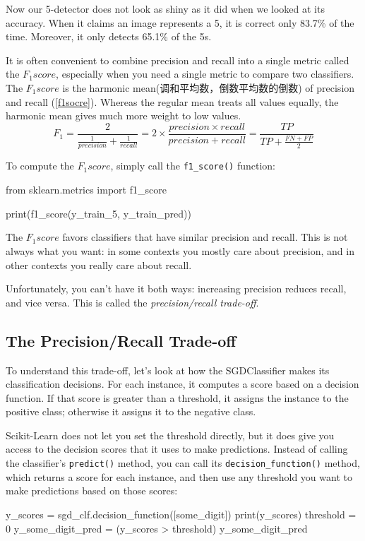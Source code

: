 Now our 5-detector does not look as shiny as it did when we looked at its accuracy. When it claims an image represents a 5, it is correct only 83.7\% of the time. Moreover, it only detects 65.1\% of the 5s.

It is often convenient to combine precision and recall into a single metric called the $F_1 score$, especially when you need a single metric to compare two classifiers. The $F_1 score$ is the harmonic mean(调和平均数，倒数平均数的倒数) of precision and recall (\autoref{f1socre}). Whereas the regular mean treats all values equally, the harmonic mean gives much more weight to low values.
\begin{equation}\label{f1socre}
    F_1 =\frac{2}{\frac{1}{precision} + \frac{1}{ recall}} = 2 \times \frac{precision \times recall}{precision + recall}=\frac{TP}{TP+\frac{FN+FP}{2}}
\end{equation}

To compute the $F_1 score$, simply call the \verb|f1_score()| function:
\begin{pyc}
from sklearn.metrics import f1_score

print(f1_score(y_train_5, y_train_pred))
\end{pyc}

The $F_1 score$ favors classifiers that have similar precision and recall. This is not always what you want: in some contexts you mostly care about precision, and in other contexts you really care about recall.

Unfortunately, you can't have it both ways: increasing precision reduces recall, and vice versa. This is called the \emph{precision/recall trade-off}.

\subsection{The Precision/Recall Trade-off}

To understand this trade-off, let's look at how the SGDClassifier makes its classification decisions. For each instance, it computes a score based on a decision function. If that score is greater than a threshold, it assigns the instance to the positive class; otherwise it assigns it to the negative class. 

Scikit-Learn does not let you set the threshold directly, but it does give you access to the decision scores that it uses to make predictions. Instead of calling the classifier's \verb|predict()| method, you can call its \verb|decision_function()| method, which returns a score for each instance, and then use any threshold you want to make predictions based on those scores:
\begin{pyc}
y_scores = sgd_clf.decision_function([some_digit])
print(y_scores)
threshold = 0
y_some_digit_pred = (y_scores > threshold)
y_some_digit_pred
\end{pyc}

